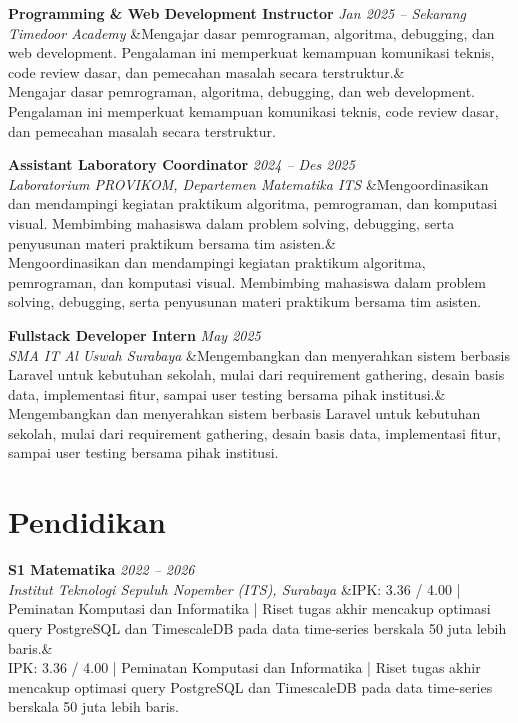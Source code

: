 \documentclass[a4paper,11pt]{article}
\newcommand{\cventry}[4]{%
  \noindent\textbf{#1} \hfill \textit{#3} \\
  \textit{#2}
  \ifx&#4& \else \\ \small #4 \fi
  \vspace{6pt}
}
\begin{document}
\cventry
  {Programming \& Web Development Instructor}
  {Timedoor Academy}
  {Jan 2025 -- Sekarang}
  {Mengajar dasar pemrograman, algoritma, debugging, dan web development. Pengalaman ini memperkuat kemampuan komunikasi teknis, code review dasar, dan pemecahan masalah secara terstruktur.}

\cventry
  {Assistant Laboratory Coordinator}
  {Laboratorium PROVIKOM, Departemen Matematika ITS}
  {2024 -- Des 2025}
  {Mengoordinasikan dan mendampingi kegiatan praktikum algoritma, pemrograman, dan komputasi visual. Membimbing mahasiswa dalam problem solving, debugging, serta penyusunan materi praktikum bersama tim asisten.}

\cventry
  {Fullstack Developer Intern}
  {SMA IT Al Uswah Surabaya}
  {May 2025}
  {Mengembangkan dan menyerahkan sistem berbasis Laravel untuk kebutuhan sekolah, mulai dari requirement gathering, desain basis data, implementasi fitur, sampai user testing bersama pihak institusi.}

\section{Pendidikan}
\cventry
  {S1 Matematika}
  {Institut Teknologi Sepuluh Nopember (ITS), Surabaya}
  {2022 -- 2026}
  {IPK: 3.36 / 4.00 | Peminatan Komputasi dan Informatika | Riset tugas akhir mencakup optimasi query PostgreSQL dan TimescaleDB pada data time-series berskala 50 juta lebih baris.}
\end{document}
